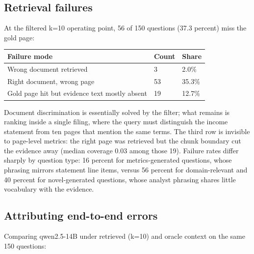 \documentclass[
  11pt,
]{article}
\newcounter{none} %
\begin{document}
\subsection{Retrieval failures}\label{retrieval-failures}

At the filtered k=10 operating point, 56 of 150 questions (37.3 percent)
miss the gold page:

{\def\LTcaptype{none} %
\begin{longtable}[]{@{}lll@{}}
\toprule\noalign{}
Failure mode & Count & Share \\
\midrule\noalign{}
\endhead
\bottomrule\noalign{}
\endlastfoot
Wrong document retrieved & 3 & 2.0\% \\
Right document, wrong page & 53 & 35.3\% \\
Gold page hit but evidence text mostly absent & 19 & 12.7\% \\
\end{longtable}
}

Document discrimination is essentially solved by the filter; what
remains is ranking inside a single filing, where the query must
distinguish the income statement from ten pages that mention the same
terms. The third row is invisible to page-level metrics: the right page
was retrieved but the chunk boundary cut the evidence away (median
coverage 0.03 among those 19). Failure rates differ sharply by question
type: 16 percent for metrics-generated questions, whose phrasing mirrors
statement line items, versus 56 percent for domain-relevant and 40
percent for novel-generated questions, whose analyst phrasing shares
little vocabulary with the evidence.

\subsection{Attributing end-to-end
errors}\label{attributing-end-to-end-errors}

Comparing qwen2.5-14B under retrieved (k=10) and oracle context on the
same 150 questions:
\end{document}
